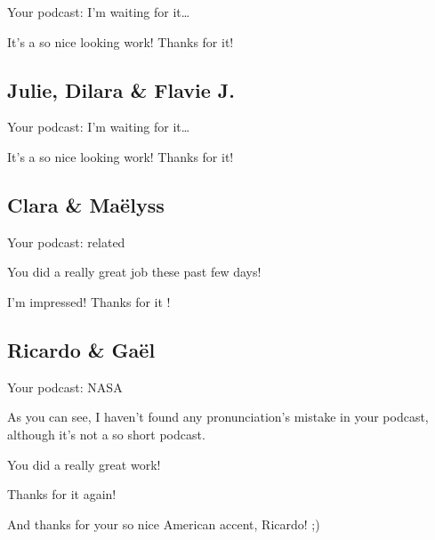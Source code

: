 \documentclass[12pt,oneside]{report}
\begin{document}
\begin{spacing}{1.2}
Your podcast: I'm waiting for it\dots

\color{blue}
It's a so nice looking work! Thanks for it!
\color{black}

\subsection*{Julie, Dilara \& Flavie J.}

Your podcast: I'm waiting for it\dots

\color{blue}
It's a so nice looking work! Thanks for it!
\color{black}

\subsection*{Clara \& Maëlyss}

Your podcast: related

\color{blue}
You did a really great job these past few days!

I'm impressed! Thanks for it !
\color{black}

\subsection*{Ricardo \& Gaël}

Your podcast: NASA

\color{blue}
As you can see, I haven't found any pronunciation's mistake in your podcast, although it's not a so short podcast.

You did a really great work!

Thanks for it again!

And thanks for your so nice American accent, Ricardo! ;)
\color{black}


\end{spacing}
\end{document}
